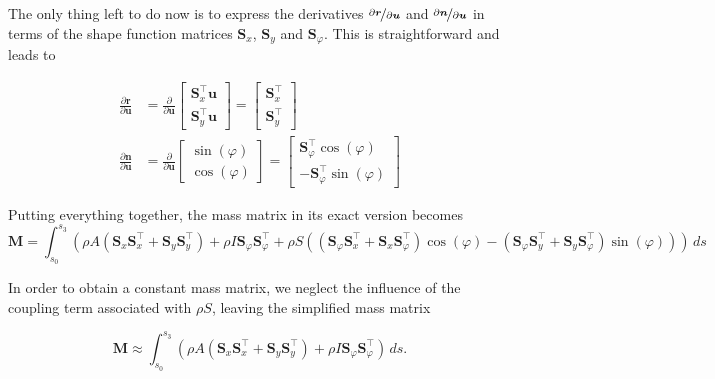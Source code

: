 The only thing left to do now is to express the derivatives $\nicefrac{\partial\boldsymbol{r}}{\partial\boldsymbol{u}}$ and $\nicefrac{\partial\boldsymbol{n}}{\partial\boldsymbol{u}}$ in terms of the shape function matrices $\boldsymbol{S}_x$, $\boldsymbol{S}_y$ and $\boldsymbol{S}_\varphi$.
This is straightforward and leads to

\begin{align}
\frac{\partial\boldsymbol{r}}{\partial\boldsymbol{u}}
&=
\frac{\partial}{\partial\boldsymbol{u}}
\begin{bmatrix}
\boldsymbol{S}_x^\intercal\boldsymbol{u} \\ \boldsymbol{S}_y^\intercal\boldsymbol{u}
\end{bmatrix}
=
\begin{bmatrix}
\boldsymbol{S}_x^\intercal \\ \boldsymbol{S}_y^\intercal
\end{bmatrix}
\\
\frac{\partial\boldsymbol{n}}{\partial\boldsymbol{u}}
&=
\frac{\partial}{\partial\boldsymbol{u}}
\begin{bmatrix}
\sin(\varphi) \\ \cos(\varphi)
\end{bmatrix}
=
\begin{bmatrix}
\boldsymbol{S}_\varphi^\intercal\cos(\varphi) \\ -\boldsymbol{S}_\varphi^\intercal\sin(\varphi)
\end{bmatrix}
\end{align}

Putting everything together, the mass matrix in its exact version becomes
%
\begin{equation}
\boldsymbol{M} = \int_{s_0}^{s_3} \left(\rho A\left(\boldsymbol{S}_x\boldsymbol{S}_x^\intercal + \boldsymbol{S}_y\boldsymbol{S}_y^\intercal\right) + \rho I\boldsymbol{S}_\varphi\boldsymbol{S}_\varphi^\intercal + \rho S\left(\left(\boldsymbol{S}_\varphi\boldsymbol{S}_x^\intercal + \boldsymbol{S}_x\boldsymbol{S}_\varphi^\intercal\right)\cos(\varphi) - \left(\boldsymbol{S}_\varphi\boldsymbol{S}_y^\intercal + \boldsymbol{S}_y\boldsymbol{S}_\varphi^\intercal\right)\sin(\varphi)\right)\right)\,ds
\end{equation}

In order to obtain a constant mass matrix, we neglect the influence of the coupling term associated with $\rho S$, leaving the simplified mass matrix

\begin{equation}
\boldsymbol{M} \approx \int_{s_0}^{s_3} \left(\rho A\left(\boldsymbol{S}_x\boldsymbol{S}_x^\intercal + \boldsymbol{S}_y\boldsymbol{S}_y^\intercal\right) + \rho I\boldsymbol{S}_\varphi\boldsymbol{S}_\varphi^\intercal\right)\,ds.
\end{equation}

